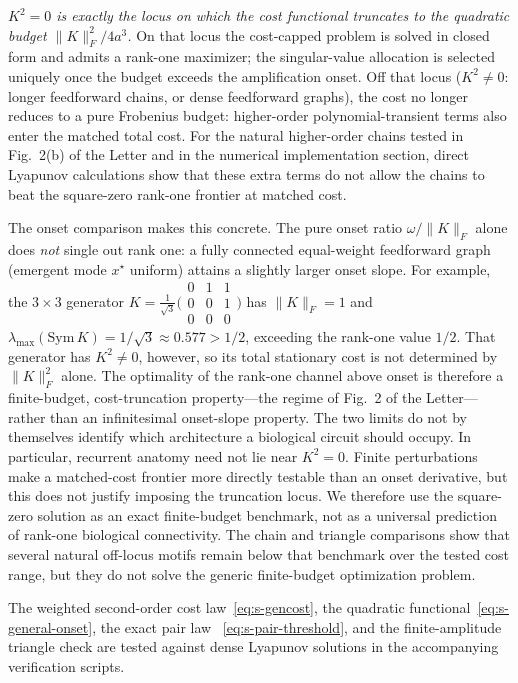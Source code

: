 \documentclass[
  aps,prl,preprint,notitlepage,superscriptaddress,nofootinbib,longbibliography,
  amsmath,amssymb
]{revtex4-2}
\begin{document}
\emph{$K^2=0$ is exactly the locus on which the cost functional truncates to the
quadratic budget $\|K\|_F^2/4a^3$.} On that locus the cost-capped problem is
solved in closed form and admits a rank-one maximizer; the singular-value
allocation is selected uniquely once the budget exceeds the amplification
onset. Off that locus
($K^2\neq0$: longer feedforward chains, or dense feedforward graphs), the cost no
longer reduces to a pure Frobenius budget: higher-order polynomial-transient
terms also enter the matched total cost. For the natural higher-order chains
tested in Fig.~2(b) of the Letter and in the numerical implementation section, direct Lyapunov
calculations show that these extra terms do not allow the chains to beat the
square-zero rank-one frontier at matched cost.

The onset comparison makes this concrete. The pure onset ratio $\omega/\|K\|_F$
alone does \emph{not} single out rank one: a fully connected equal-weight feedforward
graph (emergent mode $x^\star$ uniform) attains a slightly larger onset slope.
For example, the $3\times3$ generator $K=\tfrac{1}{\sqrt3}\big(\begin{smallmatrix}
0&1&1\\0&0&1\\0&0&0\end{smallmatrix}\big)$ has $\|K\|_F=1$ and
$\lambda_{\max}(\mathrm{Sym}\,K)=1/\sqrt3\approx0.577>1/2$, exceeding the
rank-one value $1/2$. That generator has $K^2\neq0$, however, so its total
stationary cost is not determined by $\|K\|_F^2$ alone. The optimality of the
rank-one channel above onset is therefore a finite-budget, cost-truncation
property---the regime of Fig.~2 of the Letter---rather than an infinitesimal
onset-slope property.  The two limits do not by themselves identify which
architecture a biological circuit should occupy.  In particular, recurrent
anatomy need not lie near $K^2=0$.  Finite perturbations make a matched-cost
frontier more directly testable than an onset derivative, but this does not
justify imposing the truncation locus.  We therefore use the square-zero solution as
an exact finite-budget benchmark, not as a universal prediction of rank-one
biological connectivity.  The chain and triangle comparisons show that several
natural off-locus motifs remain below that benchmark over the tested cost range,
but they do not solve the generic finite-budget optimization problem.

The weighted second-order cost law~\eqref{eq:s-gencost}, the quadratic
functional~\eqref{eq:s-general-onset}, the exact pair law
~\eqref{eq:s-pair-threshold}, and the finite-amplitude triangle check are tested
against dense Lyapunov solutions in the accompanying verification scripts.
\end{document}
